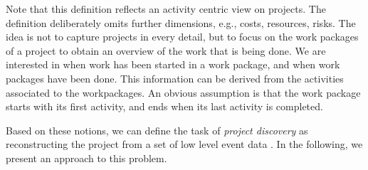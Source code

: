 Note that this definition reflects an activity centric view on projects. The definition deliberately omits further dimensions, e.g., costs, resources, risks. The idea is not to capture projects in every detail, but to focus on the work packages of a project to obtain an overview of the work that is being done. %
We are interested in when work has been started in a work package, and when work packages have been done. This information can be derived from the activities associated to the workpackages. An obvious assumption is that the work package starts with its first activity, and ends when its last activity is completed.

Based on these notions, we can define the task of \emph{project discovery} as reconstructing the project \Project from a set of low level event data \Events.
In the following, we present an approach to this problem.




